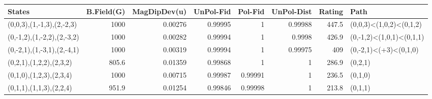 \begin{tabular}{lrrrrrrl}
\hline
 States                     &   B.Field(G) &   MagDipDev(u) &   UnPol-Fid &   Pol-Fid &   UnPol-Dist &   Rating & Path                     \\
\hline
 (0,0,3),(1,-1,3),(2,-2,3)  &       1000   &        0.00276 &     0.99995 &   1       &      0.99988 &    447.5 & (0,0,3)<(1,0,2)<(0,1,2)  \\
 (0,-1,2),(1,-2,2),(2,-3,2) &       1000   &        0.00282 &     0.99994 &   1       &      0.9998  &    426.9 & (0,-1,2)<(1,0,1)<(0,1,1) \\
 (0,-2,1),(1,-3,1),(2,-4,1) &       1000   &        0.00319 &     0.99994 &   1       &      0.99975 &    409   & (0,-2,1)<(+3)<(0,1,0)    \\
 (0,2,1),(1,2,2),(2,3,2)    &        805.6 &        0.01359 &     0.99868 &   1       &      1       &    286.9 & (0,2,1)                  \\
 (0,1,0),(1,2,3),(2,3,4)    &       1000   &        0.00715 &     0.99987 &   0.99991 &      1       &    236.5 & (0,1,0)                  \\
 (0,1,1),(1,1,3),(2,2,4)    &        951.9 &        0.01254 &     0.99846 &   0.99998 &      1       &    213.8 & (0,1,1)                  \\
\hline
\end{tabular}